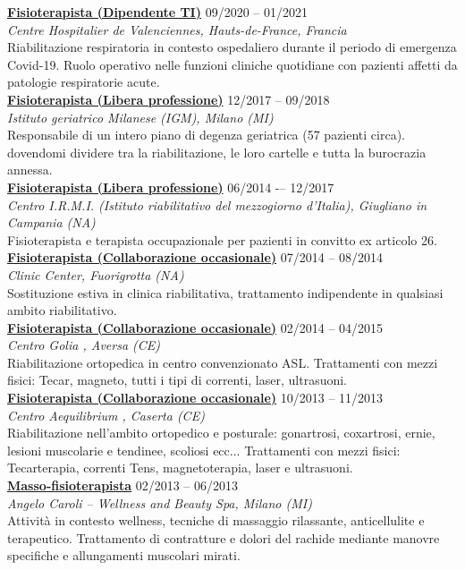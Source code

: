 \documentclass[a4paper]{article}
\newcommand{\voice}[5]{\href{#4}{\textbf{#1}} \hfill #2 \\ \textit{#3} \\ {\small #5} \vspace{0.2cm} \\}
\begin{document}
\begin{minipage}[t]{0.6\columnwidth}
    \voice{Fisioterapista (Dipendente TI)}
    {09/2020 -- 01/2021}
    {Centre Hospitalier de Valenciennes, Hauts-de-France, Francia}
    {https://www.ch-valenciennes.fr/}
    {
    Riabilitazione respiratoria in contesto ospedaliero durante il periodo di emergenza Covid-19. Ruolo operativo nelle funzioni cliniche quotidiane con pazienti affetti da patologie respiratorie acute.%
    }
    \voice{Fisioterapista (Libera professione)}
    {12/2017 -- 09/2018}
    {Istituto geriatrico Milanese (IGM), Milano (MI)}
    {https://www.igm-care.it/service/istituto-geriatrico-milanese/}
    {Responsabile di un intero piano di degenza geriatrica (57 pazienti circa). dovendomi dividere tra la riabilitazione, le loro cartelle e tutta la burocrazia annessa.}
    \voice{Fisioterapista (Libera professione)}
    {06/2014 -– 12/2017}
    {Centro I.R.M.I. (Istituto riabilitativo del mezzogiorno d'Italia), Giugliano in Campania (NA)}
    {https://www.aiopcampania.it/mostrascheda.asp?id=1425}
    {Fisioterapista e terapista occupazionale per pazienti in convitto ex articolo 26.}
    \voice{Fisioterapista (Collaborazione occasionale)}
    {07/2014 -- 08/2014}
    {Clinic Center, Fuorigrotta (NA)}
    {https://cliniccenter.eu/}
    {Sostituzione estiva in clinica riabilitativa, trattamento indipendente in qualsiasi ambito riabilitativo.
    }
    \voice{Fisioterapista (Collaborazione occasionale)}
    {02/2014 -- 04/2015}
    {Centro Golia , Aversa (CE)}
    {https://centrogolia.com/}
    {
        Riabilitazione ortopedica in centro convenzionato ASL.
        Trattamenti con mezzi fisici: Tecar, magneto, tutti i tipi di correnti, laser, ultrasuoni.}
    \voice{Fisioterapista (Collaborazione occasionale)}
    {10/2013 -- 11/2013}
    {Centro Aequilibrium , Caserta (CE)}
    {https://www.fisioterapistacaserta.it/About}
    {Riabilitazione nell'ambito ortopedico e posturale:  gonartrosi, coxartrosi, ernie, lesioni muscolarie  e tendinee, scoliosi ecc...
    Trattamenti con mezzi fisici: Tecarterapia, correnti Tens, magnetoterapia, laser e ultrasuoni.}
%
    \voice{Masso-fisioterapista}
    {02/2013 -- 06/2013}
    {Angelo Caroli – Wellness and Beauty Spa, Milano (MI)}
    {https://www.angelocaroli.com/}
    {
    Attività in contesto wellness, tecniche di massaggio rilassante, anticellulite e terapeutico.
    Trattamento di contratture e dolori del rachide mediante manovre specifiche e allungamenti muscolari mirati.
    \vspace{-0.25cm}}




















\end{minipage} 
\end{document}
